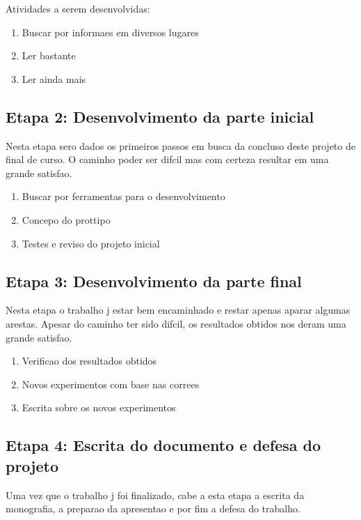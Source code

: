 Atividades a serem desenvolvidas:

\begin{enumerate}
	\item Buscar por informaes em diversos lugares
	\item Ler bastante
	\item Ler ainda mais
\end{enumerate}

\subsection*{Etapa 2: Desenvolvimento da parte inicial}
\addtocounter{etapas}{1}

Nesta etapa sero dados os primeiros passos em busca da concluso deste projeto de final de curso. O caminho poder ser difcil mas com certeza resultar em uma grande satisfao.

\begin{enumerate}
	\item Buscar por ferramentas para o desenvolvimento
	\item Concepo do prottipo
	\item Testes e reviso do projeto inicial
\end{enumerate}

\subsection*{Etapa 3: Desenvolvimento da parte final}
\addtocounter{etapas}{1}

Nesta etapa o trabalho j estar bem encaminhado e restar apenas aparar algumas arestas. Apesar do caminho ter sido difcil, os resultados obtidos nos deram uma grande satisfao.

\begin{enumerate}
	\item Verificao dos resultados obtidos
	\item Novos experimentos com base nas correes
	\item Escrita sobre os novos experimentos
\end{enumerate}

\subsection*{Etapa 4: Escrita do documento e defesa do projeto}
\addtocounter{etapas}{1}

Uma vez que o trabalho j foi finalizado, cabe a esta etapa a escrita da monografia, a preparao da apresentao e por fim a defesa do trabalho.

